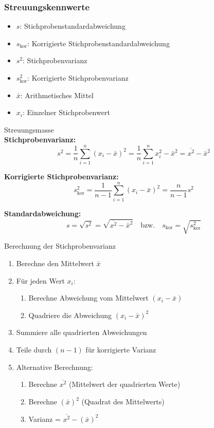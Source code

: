 \subsubsection{Streuungskennwerte}

\begin{remark}
\begin{itemize}
    \item $s$: Stichprobenstandardabweichung
    \item $s_{\text{kor}}$: Korrigierte Stichprobenstandardabweichung
    \item $s^2$: Stichprobenvarianz
    \item $s_{\text{kor}}^2$: Korrigierte Stichprobenvarianz
    \item $\bar{x}$: Arithmetisches Mittel
    \item $x_i$: Einzelner Stichprobenwert
\end{itemize}
\end{remark}

\begin{definition}{Streuungsmasse}\\
\textbf{Stichprobenvarianz:}
$$s^2 = \frac{1}{n}\sum_{i=1}^n (x_i - \bar{x})^2 = \frac{1}{n}\sum_{i=1}^n x_i^2 - \bar{x}^2 = \overline{x^{2}}-\bar{x}^{2}$$

\textbf{Korrigierte Stichprobenvarianz:}
$$s_{\text{kor}}^2 = \frac{1}{n-1}\sum_{i=1}^n (x_i - \bar{x})^2 = \frac{n}{n-1}s^2$$

\textbf{Standardabweichung:}
$$s = \sqrt{s^2} = \sqrt{\overline{x^{2}}-\bar{x}^{2}} \quad \text{bzw.} \quad s_{\text{kor}} = \sqrt{s_{\text{kor}}^2}$$
\end{definition}

\begin{KR}{Berechnung der Stichprobenvarianz}
\begin{enumerate}
    \item Berechne den Mittelwert $\bar{x}$
    \item Für jeden Wert $x_i$:
        \begin{enumerate}
            \item Berechne Abweichung vom Mittelwert $(x_i - \bar{x})$
            \item Quadriere die Abweichung $(x_i - \bar{x})^2$
        \end{enumerate}
    \item Summiere alle quadrierten Abweichungen
    \item Teile durch $(n-1)$ für korrigierte Varianz
    \item Alternative Berechnung:
        \begin{enumerate}
            \item Berechne $\overline{x^2}$ (Mittelwert der quadrierten Werte)
            \item Berechne $(\bar{x})^2$ (Quadrat des Mittelwerts)
            \item Varianz = $\overline{x^2} - (\bar{x})^2$
        \end{enumerate}
\end{enumerate}
\end{KR}

